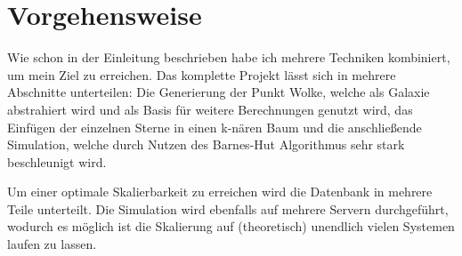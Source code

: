 \section{Vorgehensweise}
Wie schon in der Einleitung beschrieben habe ich mehrere Techniken kombiniert, um
mein Ziel zu erreichen. Das komplette Projekt lässt sich in mehrere Abschnitte
unterteilen: Die Generierung der Punkt Wolke, welche als Galaxie abstrahiert
wird und als Basis für weitere Berechnungen genutzt wird, das Einfügen der
einzelnen Sterne in einen k-nären Baum und die anschließende Simulation, welche durch Nutzen des Barnes-Hut Algorithmus sehr stark beschleunigt wird.

\par Um einer optimale Skalierbarkeit zu erreichen wird die Datenbank in
mehrere Teile unterteilt. Die Simulation wird ebenfalls auf mehrere Servern
durchgeführt, wodurch es möglich ist die Skalierung auf (theoretisch) unendlich
vielen Systemen laufen zu lassen.
